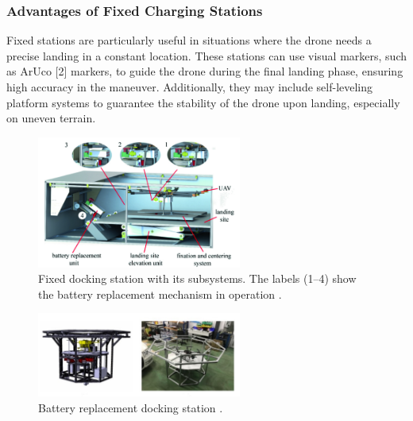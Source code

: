 \subsubsection{Advantages of Fixed Charging Stations}

    Fixed stations are particularly useful in situations where the drone needs a precise landing in a constant location. These stations can use visual markers, such as ArUco [2] markers, to guide the drone during the final landing phase, ensuring high accuracy in the maneuver. Additionally, they may include self-leveling platform systems to guarantee the stability of the drone upon landing, especially on uneven terrain.

    \begin{figure}[h!]
        \centering
        \includegraphics[width=0.6\textwidth]{pictures/fixed_charging_1.png}
        \caption{Fixed docking station with its subsystems. The labels (1–4) show the battery replacement mechanism in operation \cite{grlj_docking_stations}.}
        \label{fig:fixed_charging}
    \end{figure}

    \begin{figure}[h!]
        \centering
        \includegraphics[width=0.6\textwidth]{pictures/fixed_2.png}
        \caption{Battery replacement docking station \cite{grlj_docking_stations}.}
        \label{fig:fixed_charging}
    \end{figure}

